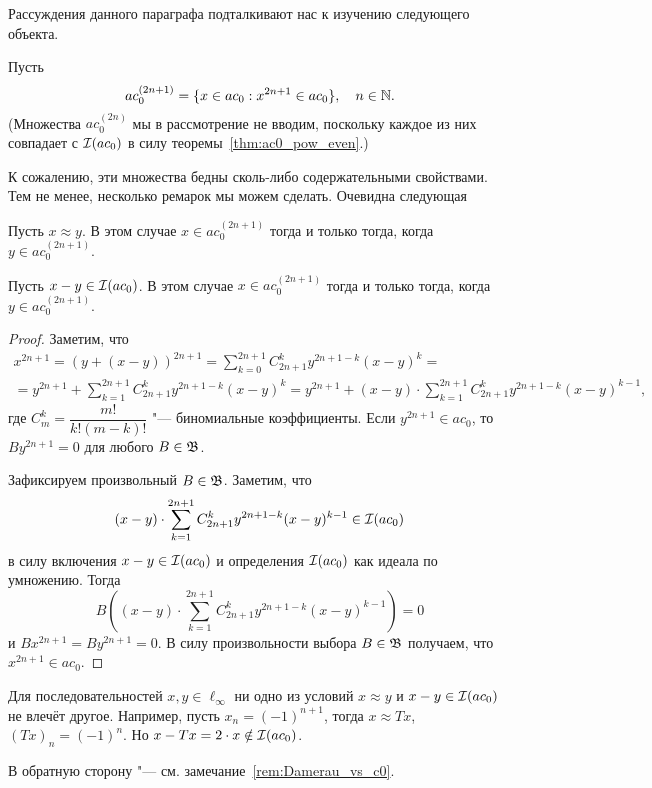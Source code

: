 Рассуждения данного параграфа подталкивают нас к изучению следующего объекта.

Пусть
\begin{equation}
	ac_0^{(2n+1)} = \{ x\in ac_0 : x^{2n+1} \in ac_0\}, \quad n\in\mathbb{N}
	.
\end{equation}
(Множества $ac_0^{(2n)}$ мы в рассмотрение не вводим, поскольку каждое из них совпадает с $\mathcal{I}(ac_0)$ в силу теоремы~\ref{thm:ac0_pow_even}.)

К сожалению, эти множества бедны сколь-либо содержательными свойствами.
Тем не менее, несколько ремарок мы можем сделать.
Очевидна следующая
\begin{lemma}
	Пусть $x \approx y$.
	В этом случае $x \in ac_0^{(2n+1)}$ тогда и только тогда, когда $y \in ac_0^{(2n+1)}$.
\end{lemma}

\begin{lemma}
	Пусть $x - y \in \mathcal{I}(ac_0)$.
	В этом случае $x \in ac_0^{(2n+1)}$ тогда и только тогда, когда $y \in ac_0^{(2n+1)}$.
\end{lemma}

\begin{proof}
	Заметим, что
	\begin{multline}
		x^{2n+1} =
		(y + (x-y))^{2n+1} =
		\sum_{k=0}^{2n+1} C_{2n+1}^k y^{2n+1-k} (x-y)^{k} =
		\\=
		y^{2n+1} + \sum_{k=1}^{2n+1} C_{2n+1}^k y^{2n+1-k} (x-y)^{k} =
		y^{2n+1} + (x-y) \cdot \sum_{k=1}^{2n+1} C_{2n+1}^k y^{2n+1-k} (x-y)^{k-1}
		,
	\end{multline}
	где $C_{m}^k = \dfrac{m!}{k!(m-k)!}$ "--- биномиальные коэффициенты.
	Если $y^{2n+1} \in ac_0$, то $B y^{2n+1} =0 $ для любого $B\in \mathfrak{B}$.

	Зафиксируем произвольный $B \in \mathfrak{B}$.
	Заметим, что
	\begin{equation}
		(x-y) \cdot \sum_{k=1}^{2n+1} C_{2n+1}^k y^{2n+1-k} (x-y)^{k-1} \in \mathcal{I}(ac_0)
	\end{equation}
	в силу включения $x-y\in\mathcal{I}(ac_0)$ и определения $\mathcal{I}(ac_0)$ как идеала по умножению.
	Тогда
	\begin{equation}
		B\left((x-y) \cdot \sum_{k=1}^{2n+1} C_{2n+1}^k y^{2n+1-k} (x-y)^{k-1}\right) = 0
	\end{equation}
	и $B x^{2n+1} = B y^{2n+1} =0$.
	В силу произвольности выбора $B \in \mathfrak{B}$ получаем, что $x^{2n+1} \in ac_0$.
\end{proof}

\begin{remark}
	Для последовательностей $x,y \in \ell_\infty$ ни одно из условий $x\approx y$ и $x-y\in\mathcal{I}(ac_0)$
	не влечёт другое.
	Например, пусть $x_n = (-1)^{n+1}$, тогда $x \approx Tx$, $(Tx)_n = (-1)^{n}$.
	Но $x-Tx = 2 \cdot x \notin \mathcal{I}(ac_0)$.

	В обратную сторону "--- см. замечание~\ref{rem:Damerau_vs_c0}.
\end{remark}

